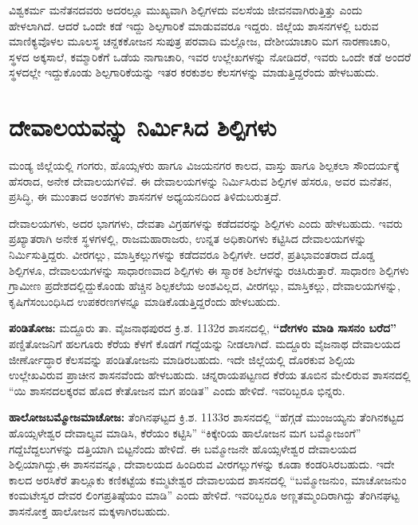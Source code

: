 ವಿಶ್ವಕರ್ಮ ಮನೆತನದವರು ಅದರಲ್ಲೂ ಮುಖ್ಯವಾಗಿ ಶಿಲ್ಪಿಗಳದು ವಲಸೆಯ ಜೀವನವಾಗಿರುತ್ತಿತ್ತು ಎಂದು ಹೇಳಲಾಗಿದೆ. ಆದರೆ ಒಂದೇ ಕಡೆ ಇದ್ದು ಶಿಲ್ಪಗಾರಿಕೆ ಮಾಡುವವರೂ ಇದ್ದರು. ಜಿಲ್ಲೆಯ ಶಾಸನಗಳಲ್ಲಿ ಬರುವ ಮಾಣಿಕ್ಯವೊಳಲ ಮೂಲಸ್ಥ ಚನ್ದಕಕೋಜನ ಸುಪುತ್ರ ಪರವಾದಿ ಮಲ್ಲೋಜ, ದೇಶೀಯಾಚಾರಿ ಮಗ ನಾರಣಾಚಾರಿ, ಸ್ಥಳದ ಅಕ್ಕಸಾಲೆ, ಕಮ್ಮಾರಿಕೆಗೆ ಒಡೆಯ ನಾಗಾಚಾರಿ, ಇವರ ಉಲ್ಲೇಖಗಳನ್ನು ನೋಡಿದರೆ, ಇವರು ಒಂದೇ ಕಡೆ ಅಂದರೆ ಸ್ಥಳದಲ್ಲೇ ಇದ್ದುಕೊಂಡು ಶಿಲ್ಪಗಾರಿಕೆಯನ್ನು ಇತರ ಕರಕುಶಲ ಕೆಲಸಗಳನ್ನು ಮಾಡುತ್ತಿದ್ದರೆಂದು ಹೇಳಬಹುದು.

\section*{ದೇವಾಲಯವನ್ನು ನಿರ್ಮಿಸಿದ ಶಿಲ್ಪಿಗಳು}

ಮಂಡ್ಯ ಜಿಲ್ಲೆಯಲ್ಲಿ ಗಂಗರು, ಹೊಯ್ಸಳರು ಹಾಗೂ ವಿಜಯನಗರ ಕಾಲದ, ವಾಸ್ತು ಹಾಗೂ ಶಿಲ್ಪಕಲಾ ಸೌಂದರ್ಯಕ್ಕೆ ಹೆಸರಾದ, ಅನೇಕ ದೇವಾಲಯಗಳಿವೆ. ಈ ದೇವಾಲಯಗಳನ್ನು ನಿರ್ಮಿಸಿರುವ ಶಿಲ್ಪಿಗಳ ಹೆಸರೂ, ಅವರ ಮನೆತನ, ಪ್ರಸಿದ್ಧಿ, ಈ ಮುಂತಾದ ಅಂಶಗಳು ಶಾಸನಗಳ ಅಧ್ಯಯನದಿಂದ ತಿಳಿದುಬರುತ್ತದೆ.

ದೇವಾಲಯಗಳು, ಅದರ ಭಾಗಗಳು, ದೇವತಾ ವಿಗ್ರಹಗಳನ್ನು ಕಡೆದವರನ್ನು ಶಿಲ್ಪಿಗಳು ಎಂದು ಹೇಳಬಹುದು. ಇವರು ಪ್ರಖ್ಯಾತರಾಗಿ ಅನೇಕ ಸ್ಥಳಗಳಲ್ಲಿ, ರಾಜಮಹಾರಾಜರು, ಉನ್ನತ ಅಧಿಕಾರಿಗಳು ಕಟ್ಟಿಸಿದ ದೇವಾಲಯಗಳನ್ನು ನಿರ್ಮಿಸು\-ತ್ತಿದ್ದರು. ವೀರಗಲ್ಲು, ಮಾಸ್ತಿಕಲ್ಲುಗಳನ್ನು ಕಡೆದವರೂ ಶಿಲ್ಪಿಗಳೇ. ಆದರೆ, ಪ್ರತಿಭಾವಂತರಾದ ದೊಡ್ಡ ಶಿಲ್ಪಿಗಳೂ, ದೇವಾಲಯಗಳನ್ನು ಸಾಧಾರಣವಾದ ಶಿಲ್ಪಿಗಳು ಈ ಸ್ಮಾರಕ ಶಿಲೆಗಳನ್ನು ರಚಿಸಿರುತ್ತಾರೆ. ಸಾಧಾರಣ ಶಿಲ್ಪಿಗಳು ಗ್ರಾಮೀಣ ಪ್ರದೇಶದಲ್ಲಿದ್ದುಕೊಂಡು ಹೆಚ್ಚಿನ ಶಿಲ್ಪಕಲೆಯ ಅಂಶವಿಲ್ಲದ, ವೀರಗಲ್ಲು, ಮಾಸ್ತಿಕಲ್ಲು, ದೇವಾಲಯಗಳನ್ನು, ಕೃಷಿಗೆ\break ಸಂಬಂಧಿಸಿದ ಉಪಕರಣಗಳನ್ನೂ ಮಾಡಿಕೊಡುತ್ತಿದ್ದರೆಂದು ಹೇಳಬಹುದು.

\textbf{ಪಂಡಿತೋಜ:} ಮದ್ದೂರು ತಾ. ವೈಜನಾಥಪುರದ ಕ್ರಿ.ಶ. 1132ರ ಶಾಸನದಲ್ಲಿ, \textbf{“ದೇಗಳಂ ಮಾಡಿ ಸಾಸನಂ ಬರೆದ”} ಪಣ್ಡಿತೋಜನಿಗೆ ಹಲಗೂರು ಕೆರೆಯ ಕೆಳಗೆ ಕೊಡಗೆ ಗದ್ದೆಯನ್ನು ನೀಡಲಾಗಿದೆ. ಮದ್ದೂರು ವೈಜನಾಥ ದೇವಾಲಯದ ಜೀರ್ಣೋದ್ಧಾರ ಕೆಲಸವನ್ನು ಪಂಡಿತೋಜನು ಮಾಡಿರಬಹುದು. ಇದೇ ಜಿಲ್ಲೆಯಲ್ಲಿ ದೊರಕುವ ಶಿಲ್ಪಿಯ ಉಲ್ಲೇಖವಿರುವ ಪ್ರಾಚೀನ ಶಾಸನವೆಂದು ಹೇಳಬಹುದು. ಚನ್ನರಾಯಪಟ್ಟಣದ ಕೆರೆಯ ತೂಬಿನ ಮೇಲಿರುವ ಶಾಸನದಲ್ಲಿ “ಯಿ ಶಾಸನದಲಕ್ಕರವ ಹೊದ ಕೇತೋಜನ ಮಗ ಪಂಡಿತ” ಎಂದು ಹೇಳಿದೆ. ಇವರಿಬ್ಬರೂ ಭಿನ್ನರು.

\textbf{ಹಾಲೋಜ\general{\enginline{-}}ಬಮ್ಮೋಜ\general{\enginline{-}}ಮಾಚೋಜ:} ತೆಂಗಿನಘಟ್ಟದ ಕ್ರಿ.ಶ. 1133ರ ಶಾಸನದಲ್ಲಿ “ಹೆಗ್ಗಡೆ ಮುಂಜಯ್ಯನು ತೆಂಗಿನಕಟ್ಟದ ಹೊಯ್ಸಳೇಶ್ವರ ದೇವಾಲ್ಯವ ಮಾಡಿಸಿ, ಕೆರೆಯಂ ಕಟ್ಟಿಸಿ” “ಕಿಕ್ಕೇರಿಯ ಹಾಲೋಜನ ಮಗ ಬಮ್ಮೋಜಂಗೆ” ಗದ್ದೆಬೆದ್ದಲುಗಳನ್ನು ದತ್ತಿಯಾಗಿ ಬಿಟ್ಟನೆಂದು ಹೇಳಿದೆ. ಈ ಬಮ್ಮೋಜನೇ ಹೊಯ್ಸಳೇಶ್ವರ ದೇವಾಲಯದ ಶಿಲ್ಪಿಯಾಗಿದ್ದು,\break ಈ ಶಾಸನವನ್ನೂ, ದೇವಾಲಯದ ಹಿಂದಿರುವ ವೀರಗಲ್ಲುಗಳನ್ನು ಕೂಡಾ ಕಂಡರಿಸಿರಬಹುದು. ಇದೇ ಕಾಲದ ಅರಸಿಕೆರೆ ತಾಲ್ಲೂಕು ಕಣಿಕಟ್ಟೆಯ ಕಮ್ಮಟೇಶ್ವರ ದೇವಾಲಯದ ಶಾಸನದಲ್ಲಿ “ಬಮ್ಮೋಜನುಂ, ಮಾಚೋಜನುಂ ಕಂಮಟೇಸ್ವರ ದೇವರ ಲಿಂಗ\-ಪ್ರತಿಷ್ಠೆಯಂ ಮಾಡಿ” ಎಂದು ಹೇಳಿದೆ. ಇವರಿಬ್ಬರೂ ಅಣ್ಣತಮ್ಮಂದಿರಾಗಿದ್ದು ತೆಂಗಿನಘಟ್ಟ ಶಾಸನೋಕ್ತ ಹಾಲೋಜನ ಮಕ್ಕಳಾಗಿರಬಹುದು.


